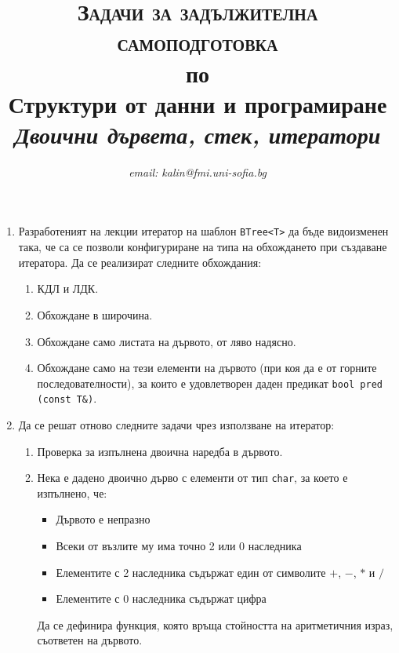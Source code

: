 \documentclass[12pt,a4paper]{article}
\author{\textit{email: kalin@fmi.uni-sofia.bg}}
\title{\textsc{Задачи за задължителна самоподготовка} \\
по \\
Структури от данни и програмиране\\
\textit{Двоични дървета, стек, итератори}}
\begin{document}
\maketitle



\begin{enumerate}

	\item Разработеният на лекции итератор на шаблон \texttt{BTree<T>} да бъде видоизменен така, че са се позволи конфигуриране на типа на обхождането при създаване итератора. Да се реализират следните обхождания:

	\begin{enumerate}
		\item КДЛ и ЛДК.
    \item Обхождане в широчина.
		\item Обхождане само листата на дървото, от ляво надясно.
		\item Обхождане само на тези елементи на дървото (при коя да е от горните последователности), за които е удовлетворен даден предикат \texttt{bool pred (const T\&)}.
  \end{enumerate}

    \item Да се решат отново следните задачи чрез използване на итератор:

    \begin{enumerate}
      \item Проверка за изпълнена двоична наредба в дървото.
      \item Нека е дадено двоично дърво с елементи от тип \texttt{char}, за което е изпълнено, че:

      	\begin{itemize}
      		\item Дървото е непразно
      		\item Всеки от възлите му има точно 2 или 0 наследника
      		\item Елементите с 2 наследника съдържат един от символите $+$, $-$, $*$ и $/$
      		\item Елементите с 0 наследника съдържат цифра
      	\end{itemize}

      	Да се дефинира функция, която връща стойността на аритметичния израз, съответен на дървото.


	\end{enumerate}





\end{enumerate}
\end{document}
